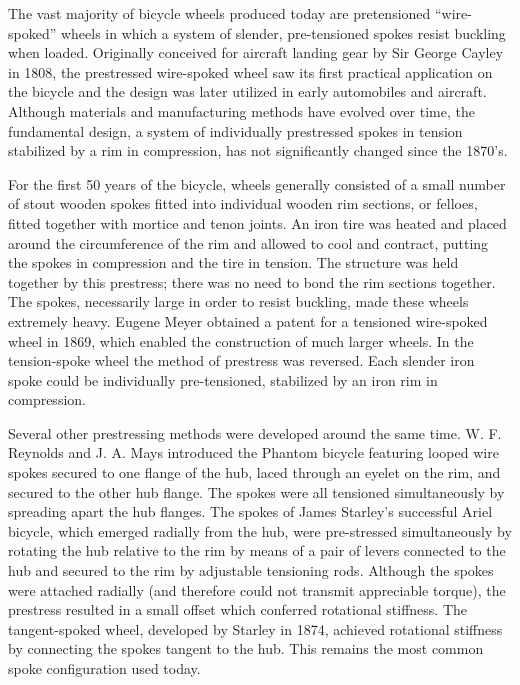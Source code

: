 \documentclass[../thesis.tex]{subfiles}
\begin{document}
The vast majority of bicycle wheels produced today are pretensioned ``wire-spoked'' wheels in which a system of slender, pre-tensioned spokes resist buckling when loaded. Originally conceived for aircraft landing gear by Sir George Cayley in 1808, the prestressed wire-spoked wheel saw its first practical application on the bicycle and the design was later utilized in early automobiles and aircraft\cite{Hadland2014}. Although materials and manufacturing methods have evolved over time, the fundamental design, a system of individually prestressed spokes in tension stabilized by a rim in compression, has not significantly changed since the 1870's.

For the first 50 years of the bicycle, wheels generally consisted of a small number of stout wooden spokes fitted into individual wooden rim sections, or felloes, fitted together with mortice and tenon joints. An iron tire was heated and placed around the circumference of the rim and allowed to cool and contract, putting the spokes in compression and the tire in tension\cite{Sharp1977}. The structure was held together by this prestress; there was no need to bond the rim sections together. The spokes, necessarily large in order to resist buckling, made these wheels extremely heavy. Eugene Meyer obtained a patent for a tensioned wire-spoked wheel in 1869, which enabled the construction of much larger wheels\cite{Clayton1991}. In the tension-spoke wheel the method of prestress was reversed. Each slender iron spoke could be individually pre-tensioned, stabilized by an iron rim in compression.

Several other prestressing methods were developed around the same time. W. F. Reynolds and J. A. Mays introduced the Phantom bicycle featuring looped wire spokes secured to one flange of the hub, laced through an eyelet on the rim, and secured to the other hub flange\cite{Herlihy2004}. The spokes were all tensioned simultaneously by spreading apart the hub flanges. The spokes of James Starley's successful Ariel bicycle, which emerged radially from the hub, were pre-stressed simultaneously by rotating the hub relative to the rim by means of a pair of levers connected to the hub and secured to the rim by adjustable tensioning rods\cite{Caunter1955}. Although the spokes were attached radially (and therefore could not transmit appreciable torque), the prestress resulted in a small offset which conferred rotational stiffness. The tangent-spoked wheel, developed by Starley in 1874, achieved rotational stiffness by connecting the spokes tangent to the hub. This remains the most common spoke configuration used today.
\end{document}
